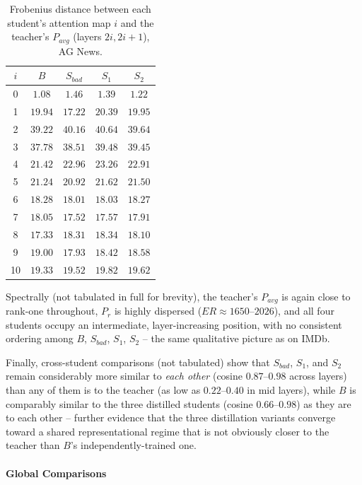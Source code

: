 \documentclass[conference]{IEEEtran}
\begin{document}
\begin{table}[h!]
\centering
\caption{Frobenius distance between each student's attention map $i$ and the teacher's $P_{avg}$ (layers $2i,2i+1$), AG News.}
    \begin{tabular}{|c|c|c|c|c|}
        \hline
        $i$ & $B$ & $S_{bad}$ & $S_1$ & $S_2$ \\
        \hline
        0 & $1.08$ & $1.46$ & $1.39$ & $1.22$ \\
        1 & $19.94$ & $17.22$ & $20.39$ & $19.95$ \\
        2 & $39.22$ & $40.16$ & $40.64$ & $39.64$ \\
        3 & $37.78$ & $38.51$ & $39.48$ & $39.45$ \\
        4 & $21.42$ & $22.96$ & $23.26$ & $22.91$ \\
        5 & $21.24$ & $20.92$ & $21.62$ & $21.50$ \\
        6 & $18.28$ & $18.01$ & $18.03$ & $18.27$ \\
        7 & $18.05$ & $17.52$ & $17.57$ & $17.91$ \\
        8 & $17.33$ & $18.31$ & $18.34$ & $18.10$ \\
        9 & $19.00$ & $17.93$ & $18.42$ & $18.58$ \\
        10 & $19.33$ & $19.52$ & $19.82$ & $19.62$ \\
        \hline
    \end{tabular}
    \label{tab:agnews_frobenius}
\end{table}

Spectrally (not tabulated in full for brevity), the teacher's $P_{avg}$ is again close to rank-one throughout, $P_r$ is highly dispersed ($ER\approx1650$--$2026$), and all four students occupy an intermediate, layer-increasing position, with no consistent ordering among $B$, $S_{bad}$, $S_1$, $S_2$ -- the same qualitative picture as on IMDb.

Finally, cross-student comparisons (not tabulated) show that $S_{bad}$, $S_1$, and $S_2$ remain considerably more similar to \emph{each other} (cosine $0.87$--$0.98$ across layers) than any of them is to the teacher (as low as $0.22$--$0.40$ in mid layers), while $B$ is comparably similar to the three distilled students (cosine $0.66$--$0.98$) as they are to each other -- further evidence that the three distillation variants converge toward a shared representational regime that is not obviously closer to the teacher than $B$'s independently-trained one.

\paragraph{Global Comparisons}
\end{document}
